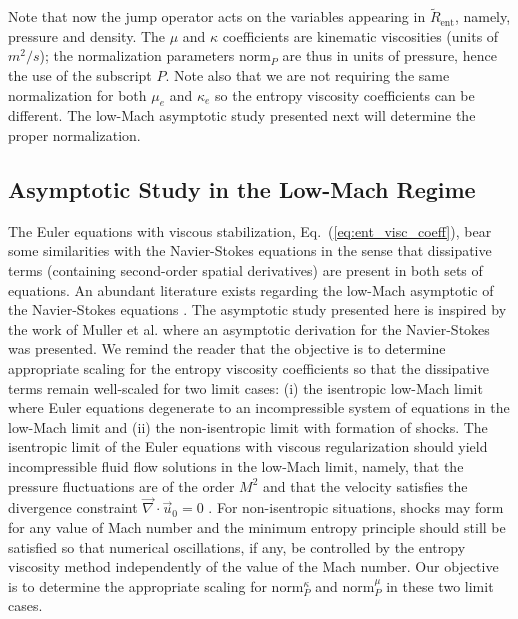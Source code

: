 \documentclass[preprint,10pt]{elsarticle}
\renewcommand{\div}{\vec{\nabla}\! \cdot \!}
\newcommand{\norm}{\textrm{norm}}
\renewcommand{\Re}{\textrm{Re}}
\newcommand{\Pe}{\textrm{P\'e}}
\newcommand{\resinew}{\widetilde{R}_\text{ent}}
\newcommand{\eqt}[1]{Eq.~(\ref{#1})}                     %
\newcommand{\tcb}[1]{\textcolor{blue}{#1}}
\begin{document}
%
Note that now the jump operator acts on the variables appearing in $\resinew$, namely, pressure and density. 
The $\mu$ and $\kappa$ coefficients are kinematic viscosities (units of $m^2/s$); the normalization 
parameters $\norm_P$ are thus in units of pressure, hence the use of the subscript $P$.  Note also 
that we are not requiring the same normalization for both $\mu_e$ and $\kappa_e$ so the entropy viscosity 
coefficients can be different. The low-Mach asymptotic study presented next will determine the proper normalization.

\subsection{Asymptotic Study in the Low-Mach Regime} \label{sec:lowMach}

The Euler equations with viscous stabilization, \eqt{eq:ent_visc_coeff}, bear some similarities with 
the Navier-Stokes equations in the sense that dissipative terms (containing second-order spatial derivatives) 
are present in both sets of equations. An abundant literature exists regarding the low-Mach asymptotic 
of the Navier-Stokes equations \cite{LowMach1, LowMach2, LowMach3, Muller}.   
%
The asymptotic study presented here is inspired by the work of Muller et al. \cite{Muller} where 
an asymptotic derivation for the Navier-Stokes was presented. 
We remind the reader that the objective is to determine appropriate scaling for the entropy 
viscosity coefficients so that the dissipative terms remain well-scaled for two limit cases: 
(i) the isentropic low-Mach limit where Euler equations degenerate to an incompressible system of 
equations in the low-Mach limit and 
(ii) the non-isentropic limit with formation of shocks. 
The isentropic limit of the Euler equations with viscous regularization should yield incompressible 
fluid flow solutions in the low-Mach limit, namely, that the pressure fluctuations are of the 
order $M^2$ and that the velocity satisfies the divergence constraint $\div \vec{u}_0 = 0$ 
\cite{LowMach1, LowMach2, LowMach3}. For non-isentropic situations, shocks may form for any 
value of Mach number and the minimum entropy principle should still be satisfied so that numerical 
oscillations, if any, be controlled by the entropy viscosity method independently of the value of the Mach number.
Our objective is to determine the appropriate scaling for $\norm_P^\kappa$ and $\norm_P^\mu$ in these two limit cases.
\end{document}
